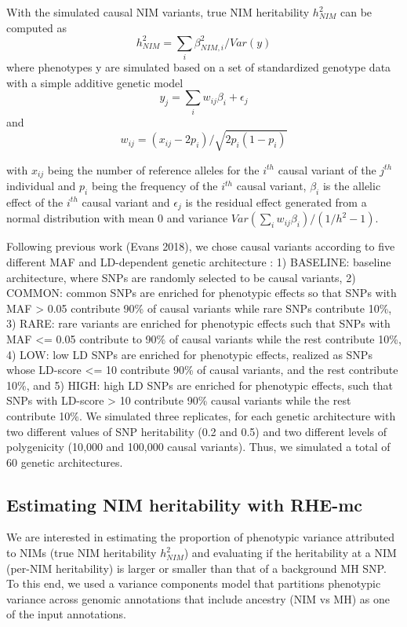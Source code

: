 With the simulated causal NIM variants, true NIM heritability $h^2_{NIM}$ can be computed as
$$h^2_{NIM} = \sum_{i}\beta^2_{NIM,i}/Var(y) $$
where phenotypes y are simulated based on a set of standardized genotype data with a simple additive genetic model
$$y_j = \sum_{i} w_{ij}\beta_i + \epsilon_j $$
and 
$$w_{ij} = (x_{ij} - 2p_i)/\sqrt{2p_i(1 - p_i)}$$

with $x_{ij}$ being the number of reference alleles for the $i^{th}$ causal variant of the $j^{th}$ individual and $p_i$ being the frequency of the $i^{th}$ causal variant, $\beta_i$ is the allelic effect of the $i^{th}$ causal variant and $\epsilon_j$ is the residual effect generated from a normal distribution with mean 0 and variance $Var(\sum_i w_{ij}\beta_i)/(1/h^2-1)$. 

Following previous work (Evans 2018), we chose causal variants according to five different MAF and LD-dependent genetic architecture : 1) BASELINE: baseline architecture, where SNPs are randomly selected to be causal variants, 2) COMMON: common SNPs are enriched for phenotypic effects so that SNPs with MAF > 0.05 contribute 90\% of causal variants while rare SNPs contribute 10\%, 3) RARE: rare variants are enriched for phenotypic effects such that SNPs with MAF <= 0.05 contribute to 90\% of causal variants while the rest contribute 10\%, 4) LOW: low LD SNPs are enriched for phenotypic effects, realized as SNPs whose LD-score <= 10 contribute 90\% of causal variants, and the rest contribute 10\%, and 5) HIGH: high LD SNPs are enriched for phenotypic effects, such that SNPs with LD-score > 10 contribute 90\% causal variants while the rest contribute 10\%. We simulated three replicates, for each genetic architecture with two different values of SNP heritability (0.2 and 0.5) and two different levels of polygenicity (10,000 and 100,000 causal variants). Thus, we simulated a total of 60 genetic architectures.

\subsection{Estimating NIM heritability with RHE-mc}
\label{sec:h2nim}
We are interested in estimating the proportion of phenotypic variance attributed to NIMs (true NIM heritability $h^2_{NIM}$) and evaluating if the heritability at a NIM (per-NIM heritability) is larger or smaller than that of a background MH SNP. To this end, we used a variance components model that partitions phenotypic variance across genomic annotations that include ancestry (NIM vs MH) as one of the input annotations.

